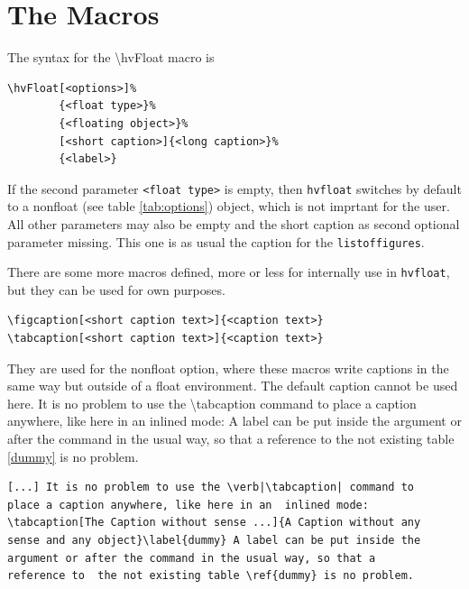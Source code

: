 \documentclass{scrartcl}
\newcommand\CMD[1]{{\small\ttfamily\textbackslash{}#1}}
\begin{document}
\section{The Macros}
The syntax for the \CMD{hvFloat} macro is
{\small\begin{verbatim}
\hvFloat[<options>]%
        {<float type>}%
        {<floating object>}%
        [<short caption>]{<long caption>}%
        {<label>}
\end{verbatim}}

If the second parameter \texttt{<float type>} is empty, then \texttt{hvfloat} switches by default to a nonfloat (see table \ref{tab:options}) object, which is not imprtant for the user. All other parameters may also be empty and the short caption as second optional parameter missing. This one is as usual the caption for the \verb|listoffigures|.

There are some more macros defined, more or less for internally use in \texttt{hvfloat}, but they can be used for own purposes.

{\small\begin{verbatim}
\figcaption[<short caption text>]{<caption text>}
\tabcaption[<short caption text>]{<caption text>}
\end{verbatim}}

They are used for the nonfloat option, where these macros write captions in the same way but outside of a float environment. The default caption cannot be used here. It is no problem to use the \CMD{tabcaption} command to place a caption anywhere, like here in an  inlined mode: \label{dummy} A label can be put inside the argument or after the command in the usual way, so that a reference to the not existing table \ref{dummy} is no problem.

{\small\begin{verbatim}
[...] It is no problem to use the \verb|\tabcaption| command to 
place a caption anywhere, like here in an  inlined mode: 
\tabcaption[The Caption without sense ...]{A Caption without any 
sense and any object}\label{dummy} A label can be put inside the 
argument or after the command in the usual way, so that a 
reference to  the not existing table \ref{dummy} is no problem.
\end{verbatim}}

\clearpage
\end{document}
